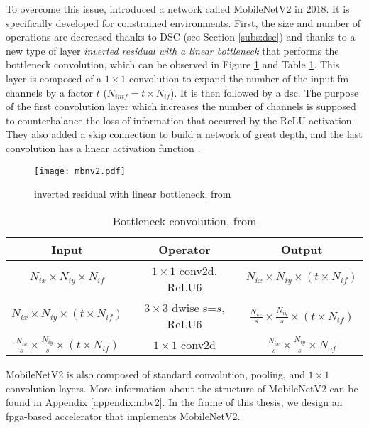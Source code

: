 To overcome this issue, \textcite{sandler_mobilenetv2_2018} introduced a network called MobileNetV2 in 2018. It is specifically developed for constrained environments. First, the size and number of operations are decreased thanks to DSC (see Section \ref{subs:dsc}) and thanks to a new type of layer \textit{inverted residual with a linear bottleneck} that performs the bottleneck convolution, which can be observed in Figure \ref{fig:invreslinbot} and Table \ref{tab:invreslinbot}.
This layer is composed of a $1 \times 1$ convolution to expand the number of the input \acrshort{fm} channels by a factor $t$ ($N_{intf} = t \times N_{if}$). It is then followed by a \acrshort{dsc}. The purpose of the first convolution layer which increases the number of channels is supposed to counterbalance the loss of information that occurred by the ReLU activation. They also added a skip connection to build a network of great depth, and the last convolution has a linear activation function \cite{sandler_mobilenetv2_2018}.

%
\begin{figure}[H]
    \centering
    \texttt{[image: mbnv2.pdf]}
    \caption{inverted residual with linear bottleneck, from \cite{sandler_mobilenetv2_2018}}
    \label{fig:invreslinbot}
\end{figure}

\begin{table}
    \center
    \begin{tabular}{c|c|c}
        Input & Operator & Output \\
        \hline \hline
        $N_{ix} \times N_{iy} \times N_{if}$ & $1 \times 1$ conv2d, ReLU6 & $N_{ix} \times N_{iy} \times (t \times N_{if})$ \\
        $N_{ix} \times N_{iy} \times (t \times N_{if})$ & $3 \times3$ dwise s=$s$, ReLU6 & $\frac{N_{ix}}{s} \times \frac{N_{iy}}{s} \times (t \times N_{if})$ \\
        $\frac{N_{ix}}{s} \times \frac{N_{iy}}{s} \times (t \times N_{if})$ & $1 \times 1$ conv2d & $\frac{N_{ix}}{s} \times \frac{N_{iy}}{s} \times N_{of}$ \\
        \hline \hline
    \end{tabular}
    \caption{Bottleneck convolution, from \cite{sandler_mobilenetv2_2018}}
    \label{tab:invreslinbot}
\end{table}

MobileNetV2 is also composed of standard convolution, pooling, and $1 \times 1$ convolution layers. More information about the structure of MobileNetV2 can be found in Appendix \ref{appendix:mbv2}. In the frame of this thesis, we design an \acrshort{fpga}-based accelerator that implements MobileNetV2.
